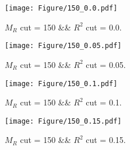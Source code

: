  
\begin{figure}[H] 
\begin{center} 
\texttt{[image: Figure/150\_0.0.pdf]} 
\caption{$M_R$ cut = 150 \&\& $R^2$ cut = 0.0.} 
\label{Fig:150_0.0} 
\end{center} 
\end{figure} 
 
 
\begin{figure}[H] 
\begin{center} 
\texttt{[image: Figure/150\_0.05.pdf]} 
\caption{$M_R$ cut = 150 \&\& $R^2$ cut = 0.05.} 
\label{Fig:150_0.05} 
\end{center} 
\end{figure} 
 
 
\begin{figure}[H] 
\begin{center} 
\texttt{[image: Figure/150\_0.1.pdf]} 
\caption{$M_R$ cut = 150 \&\& $R^2$ cut = 0.1.} 
\label{Fig:150_0.1} 
\end{center} 
\end{figure} 
 
 
\begin{figure}[H] 
\begin{center} 
\texttt{[image: Figure/150\_0.15.pdf]} 
\caption{$M_R$ cut = 150 \&\& $R^2$ cut = 0.15.} 
\label{Fig:150_0.15} 
\end{center} 
\end{figure} 
 
 

